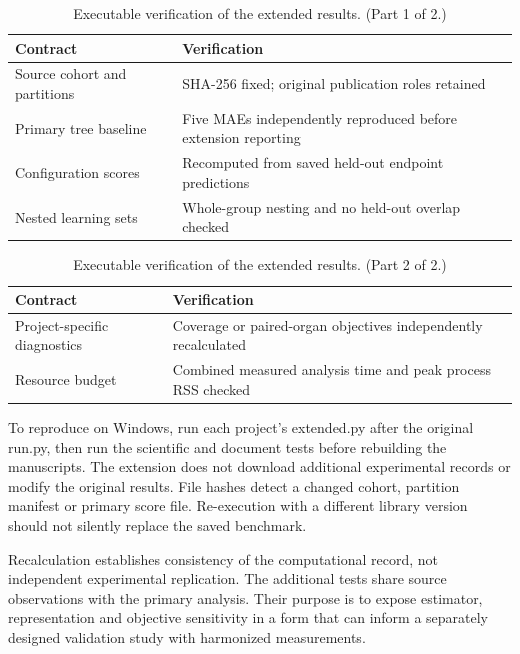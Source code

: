 \documentclass[11pt]{article}
\begin{document}
\begin{table}[H]
\centering
\small
\begin{tabularx}{\linewidth}{@{}>{\raggedright\arraybackslash}X>{\raggedright\arraybackslash}X@{}}
\toprule
\textbf{Contract} & \textbf{Verification} \\
\midrule
Source cohort and partitions & SHA-256 fixed; original publication roles retained \\
Primary tree baseline & Five MAEs independently reproduced before extension reporting \\
Configuration scores & Recomputed from saved held-out endpoint predictions \\
Nested learning sets & Whole-group nesting and no held-out overlap checked \\
\bottomrule
\end{tabularx}
\caption{Executable verification of the extended results. (Part 1 of 2.)}
\label{tab:result-40}
\end{table}
\begin{table}[H]
\centering
\small
\ContinuedFloat
\begin{tabularx}{\linewidth}{@{}>{\raggedright\arraybackslash}X>{\raggedright\arraybackslash}X@{}}
\toprule
\textbf{Contract} & \textbf{Verification} \\
\midrule
Project-specific diagnostics & Coverage or paired-organ objectives independently recalculated \\
Resource budget & Combined measured analysis time and peak process RSS checked \\
\bottomrule
\end{tabularx}
\caption{Executable verification of the extended results. (Part 2 of 2.)}
\end{table}
To reproduce on Windows, run each project's extended.py after the original run.py, then run the scientific and document tests before rebuilding the manuscripts. The extension does not download additional experimental records or modify the original results. File hashes detect a changed cohort, partition manifest or primary score file. Re-execution with a different library version should not silently replace the saved benchmark.

Recalculation establishes consistency of the computational record, not independent experimental replication. The additional tests share source observations with the primary analysis. Their purpose is to expose estimator, representation and objective sensitivity in a form that can inform a separately designed validation study with harmonized measurements.

\FloatBarrier
\end{document}
